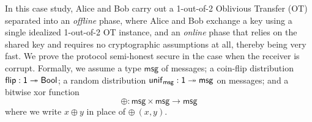 \renewcommand{\msg}{\mathsf{msg}}
\newcommand{\flip}{\mathsf{flip}}
\renewcommand{\unif}{\mathsf{unif}}
\renewcommand{\id}{\mathsf{id}}
\renewcommand{\adv}{\mathsf{adv}}
\newcommand{\sen}{\mathsf{sen}}
\newcommand{\rec}{\mathsf{rec}}
\newcommand{\ot}{\mathsf{ot}}
\renewcommand{\In}{\mathsf{In}}
\renewcommand{\Out}{\mathsf{Out}}
\newcommand{\Choice}{\mathsf{Choice}}
\newcommand{\Flip}{\mathsf{Flip}}
\renewcommand{\Key}{\mathsf{Key}}
\newcommand{\SharedKey}{\mathsf{SharedKey}}
\newcommand{\ChoiceEnc}{\mathsf{ChoiceEnc}}
\newcommand{\MsgEnc}{\mathsf{MsgEnc}}
\newcommand{\KeyPair}{\mathsf{KeyPair}}
\newcommand{\PrivateMsg}{\mathsf{PrivateMsg}}
\renewcommand{\LeakMsgRcvd}{\mathsf{LeakMsgRcvd}}
\newcommand{\LeakKeyRcvd}{\mathsf{LeakMsgRcvd}}
\newcommand{\LeakChoiceRcvd}{\mathsf{LeakMsgRcvd}}
\newcommand{\LeakFlipRcvd}{\mathsf{LeakMsgRcvd}}
\newcommand{\LeakChoice}{\mathsf{LeakChoice}}
\newcommand{\LeakFlip}{\mathsf{LeakFlip}}
\newcommand{\LeakSharedKey}{\mathsf{LeakSharedKey}}
\newcommand{\LeakOut}{\mathsf{LeakOut}}
\newcommand{\LeakChoiceEnc}{\mathsf{LeakChoiceEnc}}
\newcommand{\LeakMsgEnc}{\mathsf{LeakMsgEnc}}

In this case study, Alice and Bob carry out a 1-out-of-2 Oblivious Transfer (OT) separated into an \emph{offline} phase, where Alice and Bob exchange a key using a single idealized 1-out-of-2 OT instance, and an \emph{online} phase that relies on the shared key and requires no cryptographic assumptions at all, thereby being very fast. We prove the protocol semi-honest secure in the case when the receiver is corrupt. Formally, we assume a type $\msg$ of messages; a coin-flip distribution $\flip : \one \twoheadrightarrow \Bool$; a random distribution $\unif_\msg : \one \twoheadrightarrow \msg$ on messages; and a bitwise xor function \[\oplus : \msg \times \msg \rightarrow \msg\] where we write $x \oplus y$ in place of $\oplus \ (x,y)$.

